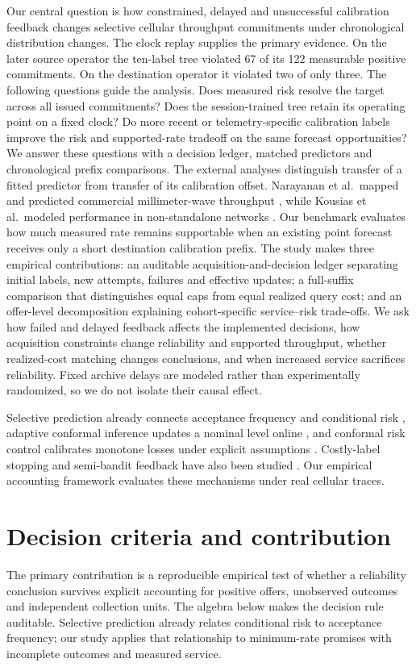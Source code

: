 \documentclass[journal,onecolumn,10pt]{IEEEtran}
\begin{document}
Our central question is how constrained, delayed and unsuccessful calibration feedback changes selective cellular throughput commitments under chronological distribution changes. The clock replay supplies the primary evidence. On the later source operator the ten-label tree violated 67 of its 122 measurable positive commitments. On the destination operator it violated two of only three. The following questions guide the analysis. Does measured risk resolve the target across all issued commitments? Does the session-trained tree retain its operating point on a fixed clock? Do more recent or telemetry-specific calibration labels improve the risk and supported-rate tradeoff on the same forecast opportunities? We answer these questions with a decision ledger, matched predictors and chronological prefix comparisons. The external analyses distinguish transfer of a fitted predictor from transfer of its calibration offset.
Narayanan et al.\ mapped and predicted commercial millimeter-wave throughput \cite{narayanan2020}, while Kousias et al.\ modeled performance in non-standalone networks \cite{kousias2024model}. Our benchmark evaluates how much measured rate remains supportable when an existing point forecast receives only a short destination calibration prefix.
The study makes three empirical contributions: an auditable acquisition-and-decision ledger separating initial labels, new attempts, failures and effective updates; a full-suffix comparison that distinguishes equal caps from equal realized query cost; and an offer-level decomposition explaining cohort-specific service--risk trade-offs. We ask how failed and delayed feedback affects the implemented decisions, how acquisition constraints change reliability and supported throughput, whether realized-cost matching changes conclusions, and when increased service sacrifices reliability. Fixed archive delays are modeled rather than experimentally randomized, so we do not isolate their causal effect.

Selective prediction already connects acceptance frequency and conditional risk \cite{geifman2017}, adaptive conformal inference updates a nominal level online \cite{gibbs2021}, and conformal risk control calibrates monotone losses under explicit assumptions \cite{angelopoulos2024risk}. Costly-label stopping and semi-bandit feedback have also been studied \cite{ilyas2026,ge2025}. Our empirical accounting framework evaluates these mechanisms under real cellular traces.

\section{Decision criteria and contribution}
The primary contribution is a reproducible empirical test of whether a reliability conclusion survives explicit accounting for positive offers, unobserved outcomes and independent collection units. The algebra below makes the decision rule auditable. Selective prediction already relates conditional risk to acceptance frequency; our study applies that relationship to minimum-rate promises with incomplete outcomes and measured service.
\end{document}
